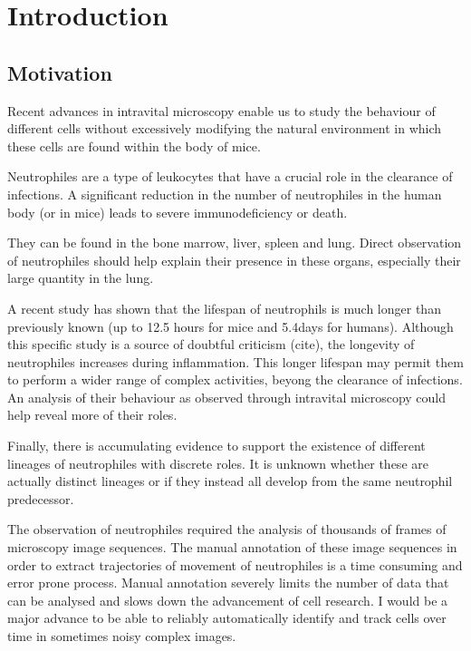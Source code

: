 	\chapter{Introduction \statusfirstdraft}

	\section{Motivation \statusfirstdraft}
		
		Recent advances in intravital microscopy enable us to study the behaviour of different cells without excessively modifying the natural environment in which these cells are found within the body of mice. 
			
		Neutrophiles are a type of leukocytes that have a crucial role in the clearance of infections. A significant reduction in the number of neutrophiles in the human body (or in mice) leads to severe immunodeficiency or death.
		
		They can be found in the bone marrow, liver, spleen and lung. Direct observation of neutrophiles should help explain their presence in these organs, especially their large quantity in the lung.
		
		A recent study has shown that the lifespan of neutrophils is much longer than previously known (up to 12.5 hours for mice and 5.4days for humans). Although this specific study is a source of doubtful criticism (cite), the longevity of neutrophiles increases during inflammation. This longer lifespan may permit them to perform a wider range of complex activities, beyong the clearance of infections. An analysis of their behaviour as observed through intravital microscopy could help reveal more of their roles.
		
		Finally, there is accumulating evidence to support the existence of different lineages of neutrophiles with discrete roles. It is unknown whether these are actually distinct lineages or if they instead all develop from the same neutrophil predecessor.
		
		The observation of neutrophiles required the analysis of thousands of frames of microscopy image sequences. The manual annotation of these image sequences in order to extract trajectories of movement of neutrophiles is a time consuming and error prone process. Manual annotation severely limits the number of data that can be analysed and slows down the advancement of cell research. I would be a major advance to be able to reliably automatically identify and track cells over time in sometimes noisy complex images.
		
